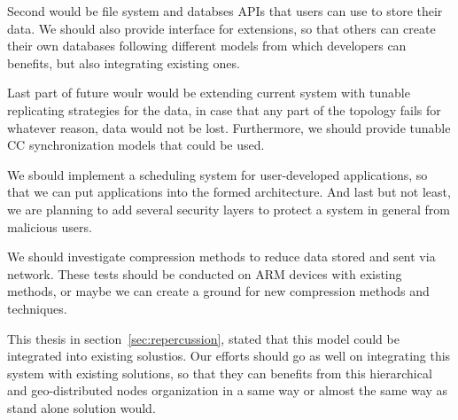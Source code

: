 Second would be file system and databses APIs that users can use to store their data. We should also provide interface for extensions, so that others can create their own databases following different models from which developers can benefits, but also integrating existing ones.

Last part of future woulr would be extending current system with tunable replicating strategies for the data, in case that any part of the topology fails for whatever reason, data would not be lost. Furthermore, we should provide tunable CC synchronization models that could be used.

We sbould implement a scheduling system for user-developed applications, so that we can put applications into the formed architecture. And last but not least, we are planning to add several security layers to protect a system in general from malicious users.

We should investigate compression methods to reduce data stored and sent via network. These tests should be conducted on ARM devices with existing methods, or maybe we can create a ground for new compression methods and techniques.

This thesis in section~\ref{sec:repercussion}, stated that this model could be integrated into existing solustios. Our efforts should go as well on integrating this system with existing solutions, so that they can benefits from this hierarchical and geo-distributed nodes organization in a same way or almost the same way as stand alone solution would.
%
%